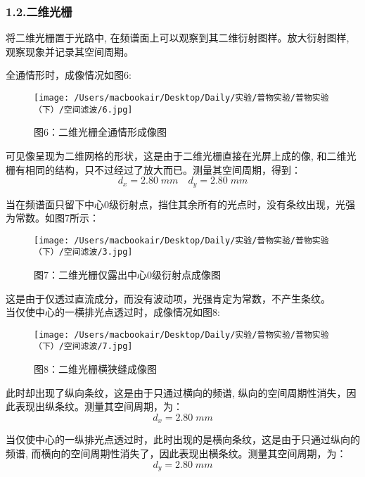 \documentclass[23pt,a4paper,two column]{article}
\begin{document}
\subsubsection*{1.2.二维光栅}

将二维光栅置于光路中, 在频谱面上可以观察到其二维衍射图样。放大衍射图样, 观察现象并记录其空间周期。

全通情形时，成像情况如图6:
\begin{figure}[H]
\centering
\texttt{[image: /Users/macbookair/Desktop/Daily/实验/普物实验/普物实验（下）/空间滤波/6.jpg]}
\caption*{图6：二维光栅全通情形成像图}
\end{figure}

可见像呈现为二维网格的形状，这是由于二维光栅直接在光屏上成的像, 和二维光栅有相同的结构，只不过经过了放大而已。测量其空间周期，得到：
\begin{equation*}
d_x=2.80\;mm\quad d_y=2.80\;mm
\end{equation*}

\newpage

当在频谱面只留下中心0级衍射点，挡住其余所有的光点时，没有条纹出现，光强为常数。如图7所示：
\begin{figure}[H]
\centering
\texttt{[image: /Users/macbookair/Desktop/Daily/实验/普物实验/普物实验（下）/空间滤波/3.jpg]}
\caption*{图7：二维光栅仅露出中心0级衍射点成像图}
\end{figure}

这是由于仅透过直流成分，而没有波动项，光强肯定为常数，不产生条纹。\\

当仅使中心的一横排光点透过时，成像情况如图8:
\begin{figure}[H]
\centering
\texttt{[image: /Users/macbookair/Desktop/Daily/实验/普物实验/普物实验（下）/空间滤波/7.jpg]}
\caption*{图8：二维光栅横狭缝成像图}
\end{figure}

此时却出现了纵向条纹，这是由于只通过横向的频谱, 纵向的空间周期性消失，因此表现出纵条纹。测量其空间周期，为：
\begin{equation*}
d_x=2.80\;mm
\end{equation*}

\newpage

当仅使中心的一纵排光点透过时，此时出现的是横向条纹，这是由于只通过纵向的频谱, 而横向的空间周期性消失了，因此表现出横条纹。测量其空间周期，为：
\begin{equation*}
d_y=2.80\;mm
\end{equation*}
\end{document}
